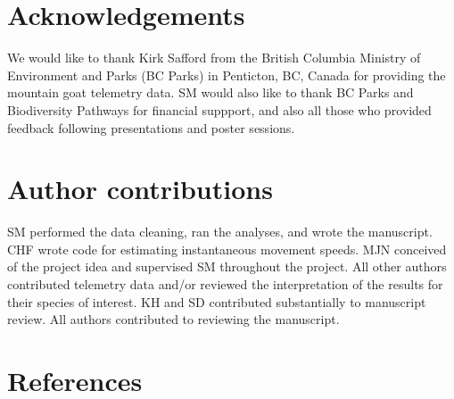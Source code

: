 \documentclass[
  12pt,
]{article}
\begin{document}
\section*{Acknowledgements}\label{acknowledgements}

\noindent We would like to thank Kirk Safford from the British Columbia Ministry of Environment and Parks (BC Parks) in Penticton, BC, Canada for providing the mountain goat telemetry data. SM would also like to thank BC Parks and Biodiversity Pathways for financial suppport, and also all those who provided feedback following presentations and poster sessions.

\section*{Author contributions}\label{author-contributions}

\noindent SM performed the data cleaning, ran the analyses, and wrote the manuscript. CHF wrote code for estimating instantaneous movement speeds. MJN conceived of the project idea and supervised SM throughout the project. All other authors contributed telemetry data and/or reviewed the interpretation of the results for their species of interest. KH and SD contributed substantially to manuscript review. All authors contributed to reviewing the manuscript.

\clearpage

\newpage

\section*{References}\label{references}

\end{document}
